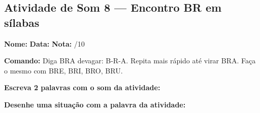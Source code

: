 \subsection{Atividade de Som 8 --- Encontro BR em sílabas}
\begin{exercicio}



\noindent\textbf{Nome:} \underline{\hspace{3.2cm}} \quad \textbf{Data:} \underline{\hspace{1.6cm}} \quad \textbf{Nota:} \underline{\hspace{0.9cm}}/10


\noindent\textbf{Comando:} Diga BRA devagar: B-R-A. Repita mais rápido até virar BRA. Faça o mesmo com BRE, BRI, BRO, BRU.


\begin{center}
\end{center}

\noindent\textbf{Escreva 2 palavras com o som da atividade:}

\begin{center}
  \underline{\hspace{3cm}} \quad \underline{\hspace{3cm}}
\end{center}

\noindent\textbf{Desenhe uma situação com a palavra da atividade:}

\begin{center}
\end{center}

\end{exercicio}



